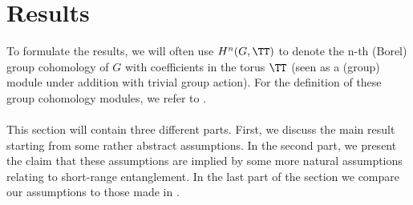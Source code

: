 \section{Results}
To formulate the results, we will often use $H^n(G,\TT)$ to denote the n-th (Borel) group cohomology of $G$ with coefficients in the torus $\TT$ (seen as a (group) module under addition with trivial group action). For the definition of these group cohomology modules, we refer to \cite{benson1991representations}.
\\\\
This section will contain three different parts. First, we discuss the main result starting from some rather abstract assumptions. In the second part, we present the claim that these assumptions are implied by some more natural assumptions relating to short-range entanglement. In the last part of the section we compare our assumptions to those made in \cite{Ogata2d}.
